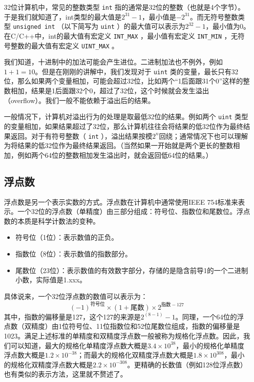 32位计算机中，常见的整数类型 \texttt{int} 指的通常是32位的整数（也就是4个字节）。于是我们就知道了，int类型的最大值是$2^{31}-1$，最小值是$-2^{31}$。而无符号整数类型 \texttt{unsigned int} （以下简写为 \texttt{uint} ）的最大值可以表示为$2^{32}-1$，最小值为0。在C/C++中，int的最大值有宏定义 \texttt{INT\_MAX} ，最小值有宏定义 \texttt{INT\_MIN} ，无符号整数的最大值有宏定义 \texttt{UINT\_MAX} 。

我们知道，十进制中的加法可能会产生进位。二进制加法也不例外，例如$1+1=10$。但是在刚刚的讲解中，我们发现对于 \texttt{uint} 类的变量，最长只有32位，那么如果两个变量相加，可能会超过32位，比如两个“1后面跟31个0”这样的整数相加，结果是1后面跟32个0，超过了32位，这个时候就会发生溢出（overflow）。我们一般不能依赖于溢出后的结果。

一般情况下，计算机对溢出行为的处理是取最低32位的结果。例如两个 \texttt{uint} 类型的变量相加，如果结果超过了32位，那么计算机往往会将结果的低32位作为最终结果返回。对于有符号整数（ \texttt{int} ），溢出结果按模$2^n$回绕；通常情况下也可以理解为将结果的低32位作为最终结果返回。（当然如果一开始就是两个更长的整数相加，例如两个64位的整数相加发生溢出时，就会返回低64位的结果。）

\subsection{浮点数}

浮点数是另一个表示实数的方式。浮点数在计算机中通常使用IEEE 754标准来表示。一个32位的浮点数（单精度）由三部分组成：符号位、指数位和尾数位。浮点数的本质是科学计数法的变种。
\begin{itemize}
  \item 符号位（1位）：表示数值的正负。
  \item 指数位（8位）：表示数值的指数部分。
  \item 尾数位（23位）：表示数值的有效数字部分，存储的是隐含前导1的一个二进制小数，实际值是1.xxx。
\end{itemize}

具体说来，一个32位浮点数的数值可以表示为：
$$(-1)^{\text{符号位}} \times (1 + \text{尾数}) \times 2^{\text{指数} - 127}$$
其中，指数的偏移量是127，这个127的来源是$2^{(8-1)} - 1$。同理，一个64位的浮点数（双精度）由1位符号位、11位指数位和52位尾数位组成，指数的偏移量是1023。满足上述标准的单精度和双精度浮点数一般被称为规格化浮点数。因此，我们可以知道，最大的规格化单精度浮点数大概是$3.4 \times 10^{38}$，最小的规格化单精度浮点数大概是$1.2 \times 10^{-38}$；而最大的规格化双精度浮点数大概是$1.8 \times 10^{308}$，最小的规格化双精度浮点数大概是$2.2 \times 10^{-308}$。更精确的长数值（例如128位浮点数）也有类似的表示方法，这里就不赘述了。

